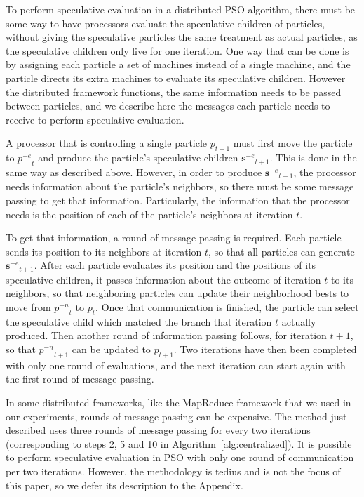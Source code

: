 \documentclass[journal,letterpaper]{IEEEtran}
\newcommand{\alg}[1]{Algorithm~\ref{alg:#1}}
\providecommand{\noeval}[1]{\ensuremath{#1^{-e}}}
\providecommand{\nonbest}[1]{\ensuremath{#1^{-n}}}
\providecommand{\p}{\ensuremath{p}}
\providecommand{\sset}{\ensuremath{\mathbf{s}}}
\begin{document}
To perform speculative evaluation in a distributed PSO algorithm, there must be
some way to have processors evaluate the speculative children of particles,
without giving the speculative particles the same treatment as actual
particles, as the speculative children only live for one iteration.  One way
that can be done is by assigning each particle a set of machines instead of a
single machine, and the particle directs its extra machines to evaluate its
speculative children.  However the distributed framework functions, the same
information needs to be passed between particles, and we describe here the
messages each particle needs to receive to perform speculative evaluation.

A processor that is controlling a single particle $\p_{t-1}$ must first move
the particle to $\noeval{\p}_t$ and produce the particle's speculative children
$\noeval{\sset}_{t+1}$.  This is done in the same way as described above.
However, in order to produce $\noeval{\sset}_{t+1}$, the processor needs
information about the particle's neighbors, so there must be some message
passing to get that information.  Particularly, the information that the
processor needs is the position of each of the particle's neighbors at
iteration $t$.

To get that information, a round of message passing is required.  Each particle
sends its position to its neighbors at iteration $t$, so that all particles can
generate $\noeval{\sset}_{t+1}$.  After each particle evaluates its position
and the positions of its speculative children, it passes information about the
outcome of iteration $t$ to its neighbors, so that neighboring particles can
update their neighborhood bests to move from $\nonbest{\p}_t$ to $\p_t$.  Once
that communication is finished, the particle can select the speculative child
which matched the branch that iteration $t$ actually produced.  Then another
round of information passing follows, for iteration $t+1$, so that
$\nonbest{\p}_{t+1}$ can be updated to $\p_{t+1}$.  Two iterations have then
been completed with only one round of evaluations, and the next iteration can
start again with the first round of message passing.

In some distributed frameworks, like the MapReduce framework that we used in
our experiments, rounds of message passing can be expensive.  The method just
described uses three rounds of message passing for every two iterations
(corresponding to steps 2, 5 and 10 in \alg{centralized}).  It is possible to
perform speculative evaluation in PSO with only one round of communication per
two iterations.  However, the methodology is tedius and is not the focus of
this paper, so we defer its description to the Appendix.
\end{document}
